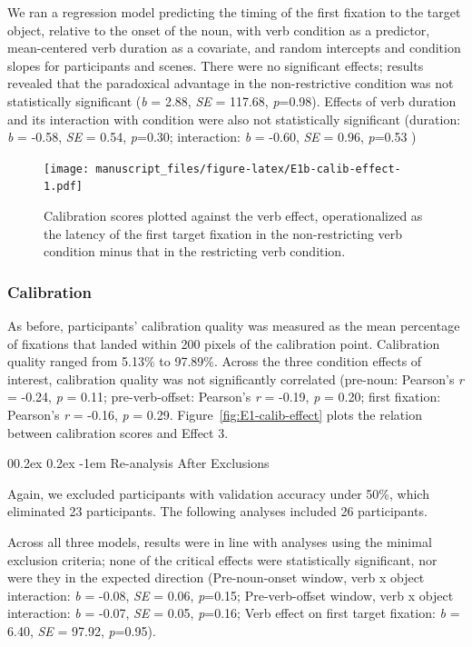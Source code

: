 \documentclass[
  man,floatsintext]{apa6}
\makeatletter
\let\oldparagraph\paragraph
\renewcommand{\paragraph}[1]{\oldparagraph{#1}\mbox{}}
\renewcommand{\paragraph}{\@startsection{paragraph}{4}{\parindent}%
  {0\baselineskip \@plus 0.2ex \@minus 0.2ex}%
  {-1em}%
  {\normalfont\normalsize\bfseries\itshape\typesectitle}}
\makeatother
\begin{document}
We ran a regression model predicting the timing of the first fixation to the target object, relative to the onset of the noun, with verb condition as a predictor, mean-centered verb duration as a covariate, and random intercepts and condition slopes for participants and scenes. There were no significant effects; results revealed that the paradoxical advantage in the non-restrictive condition was not statistically significant (\emph{b} = 2.88, \emph{SE} = 117.68, \emph{p}=0.98). Effects of verb duration and its interaction with condition were also not statistically significant (duration: \emph{b} = -0.58, \emph{SE} = 0.54, \emph{p}=0.30; interaction: \emph{b} = -0.60, \emph{SE} = 0.96, \emph{p}=0.53 )

\begin{figure}
\centering
\texttt{[image: manuscript\_files/figure-latex/E1b-calib-effect-1.pdf]}
\caption{\label{fig:E1b-calib-effect}Calibration scores plotted against the verb effect, operationalized as the latency of the first target fixation in the non-restricting verb condition minus that in the restricting verb condition.}
\end{figure}

\subsubsection{Calibration}\label{calibration-1}

As before, participants' calibration quality was measured as the mean percentage of fixations that landed within 200 pixels of the calibration point. Calibration quality ranged from 5.13\% to 97.89\%.
Across the three condition effects of interest, calibration quality was not significantly correlated (pre-noun: Pearson's \emph{r} = -0.24, \emph{p} = 0.11; pre-verb-offset: Pearson's \emph{r} = -0.19, \emph{p} = 0.20; first fixation: Pearson's \emph{r} = -0.16, \emph{p} = 0.29. Figure~\ref{fig:E1-calib-effect} plots the relation between calibration scores and Effect 3.

\paragraph{Re-analysis After Exclusions}\label{re-analysis-after-exclusions-1}

Again, we excluded participants with validation accuracy under 50\%, which eliminated 23 participants. The following analyses included 26 participants.

Across all three models, results were in line with analyses using the minimal exclusion criteria; none of the critical effects were statistically significant, nor were they in the expected direction (Pre-noun-onset window, verb x object interaction: \emph{b} = -0.08, \emph{SE} = 0.06, \emph{p}=0.15; Pre-verb-offset window, verb x object interaction: \emph{b} = -0.07, \emph{SE} = 0.05, \emph{p}=0.16; Verb effect on first target fixation: \emph{b} = 6.40, \emph{SE} = 97.92, \emph{p}=0.95).
\end{document}
